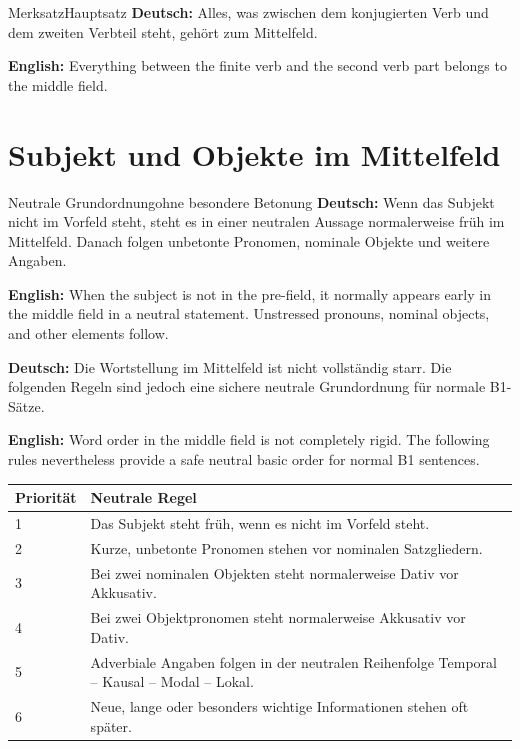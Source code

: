 \documentclass[a4paper,11pt]{article}
\newcommand{\GermanText}[1]{\textbf{Deutsch: }#1\par}
\newcommand{\EnglishText}[1]{{\small\color{SoftGray}\textbf{English: }#1\par}}
\newcommand{\TableHeader}[1]{\color{white}\textbf{#1}}
\begin{document}
        \begin{grammarentry}{Merksatz}{Hauptsatz}
            \GermanText{Alles, was zwischen dem konjugierten Verb und dem zweiten Verbteil steht, gehört zum Mittelfeld.}
            \EnglishText{Everything between the finite verb and the second verb part belongs to the middle field.}
        \end{grammarentry}
    
    
    \section{Subjekt und Objekte im Mittelfeld}
        
        \begin{grammarentry}{Neutrale Grundordnung}{ohne besondere Betonung}
            \GermanText{Wenn das Subjekt nicht im Vorfeld steht, steht es in einer neutralen Aussage normalerweise früh im Mittelfeld. Danach folgen unbetonte Pronomen, nominale Objekte und weitere Angaben.}
            \EnglishText{When the subject is not in the pre-field, it normally appears early in the middle field in a neutral statement. Unstressed pronouns, nominal objects, and other elements follow.}
            
            \GermanText{Die Wortstellung im Mittelfeld ist nicht vollständig starr. Die folgenden Regeln sind jedoch eine sichere neutrale Grundordnung für normale B1-Sätze.}
            \EnglishText{Word order in the middle field is not completely rigid. The following rules nevertheless provide a safe neutral basic order for normal B1 sentences.}
        \end{grammarentry}
        
        \begin{longtable}{|p{3.5cm}|p{10.7cm}|}
            \hline
            \rowcolor{HeaderBlueDark}
            \TableHeader{Priorität} & \TableHeader{Neutrale Regel} \\
            \hline
            1 & Das Subjekt steht früh, wenn es nicht im Vorfeld steht. \\
            \hline
            2 & Kurze, unbetonte Pronomen stehen vor nominalen Satzgliedern. \\
            \hline
            3 & Bei zwei nominalen Objekten steht normalerweise Dativ vor Akkusativ. \\
            \hline
            4 & Bei zwei Objektpronomen steht normalerweise Akkusativ vor Dativ. \\
            \hline
            5 & Adverbiale Angaben folgen in der neutralen Reihenfolge Temporal -- Kausal -- Modal -- Lokal. \\
            \hline
            6 & Neue, lange oder besonders wichtige Informationen stehen oft später. \\
            \hline
        \end{longtable}
    
\end{document}
